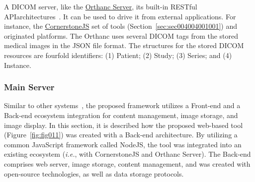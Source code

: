 A \ac{DICOM} server, like the \href{https://www.orthanc-server.com}{Orthanc Server}, its built-in RESTful API\footnotemark[18] architectures~\cite{6556444}.
It can be used to drive it from external applications.
For instance, the \href{https://cornerstonejs.org/}{CornerstoneJS} set of tools (Section~\ref{sec:sec004004001001}) and originated platforms.
The Orthanc uses several \ac{DICOM} tags from the stored medical images in the \ac{JSON} file format.
The structures for the stored \ac{DICOM} resources are fourfold identifiers:
(1) Patient;
(2) Study;
(3) Series; and
(4) Instance.


\subsubsection{Main Server}
\label{sec:sec004004001003}

Similar to other systems~\cite{HOSTETTER2018811}, the proposed framework utilizes a Front-end and a Back-end ecosystem integration for content management, image storage, and image display.
In this section, it is described how the proposed web-based tool (Figure~\ref{fig:fig011}) was created with a Back-end architecture.
By utilizing a common JavaScript framework called NodeJS, the tool was integrated into an existing ecosystem ({\it i.e.}, with CornerstoneJS and Orthanc Server).
The Back-end comprises web server, image storage, content management, and was created with open-source technologies, as well as data storage protocols.

